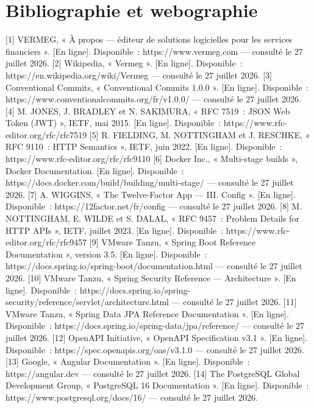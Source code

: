 \documentclass[12pt,a4paper]{report}
\begin{document}
\chapter*{Bibliographie et webographie}
[1] VERMEG, « À propos — éditeur de solutions logicielles pour les services financiers ». [En ligne]. Disponible~: https://www.vermeg.com — consulté le 27 juillet 2026.
[2] Wikipedia, « Vermeg ». [En ligne]. Disponible~: https://en.wikipedia.org/wiki/Vermeg — consulté le 27 juillet 2026.
[3] Conventional Commits, « Conventional Commits 1.0.0 ». [En ligne]. Disponible~: https://www.conventionalcommits.org/fr/v1.0.0/ — consulté le 27 juillet 2026.
[4] M. JONES, J. BRADLEY et N. SAKIMURA, « RFC 7519~: JSON Web Token (JWT) », IETF, mai 2015. [En ligne]. Disponible~: https://www.rfc-editor.org/rfc/rfc7519
[5] R. FIELDING, M. NOTTINGHAM et J. RESCHKE, « RFC 9110~: HTTP Semantics », IETF, juin 2022. [En ligne]. Disponible~: https://www.rfc-editor.org/rfc/rfc9110
[6] Docker Inc., « Multi-stage builds », Docker Documentation. [En ligne]. Disponible~: https://docs.docker.com/build/building/multi-stage/ — consulté le 27 juillet 2026.
[7] A. WIGGINS, « The Twelve-Factor App — III. Config ». [En ligne]. Disponible~: https://12factor.net/fr/config — consulté le 27 juillet 2026.
[8] M. NOTTINGHAM, E. WILDE et S. DALAL, « RFC 9457~: Problem Details for HTTP APIs », IETF, juillet 2023. [En ligne]. Disponible~: https://www.rfc-editor.org/rfc/rfc9457
[9] VMware Tanzu, « Spring Boot Reference Documentation », version 3.5. [En ligne]. Disponible~: https://docs.spring.io/spring-boot/documentation.html — consulté le 27 juillet 2026.
[10] VMware Tanzu, « Spring Security Reference — Architecture ». [En ligne]. Disponible~: https://docs.spring.io/spring-security/reference/servlet/architecture.html — consulté le 27 juillet 2026.
[11] VMware Tanzu, « Spring Data JPA Reference Documentation ». [En ligne]. Disponible~: https://docs.spring.io/spring-data/jpa/reference/ — consulté le 27 juillet 2026.
[12] OpenAPI Initiative, « OpenAPI Specification v3.1 ». [En ligne]. Disponible~: https://spec.openapis.org/oas/v3.1.0 — consulté le 27 juillet 2026.
[13] Google, « Angular Documentation ». [En ligne]. Disponible~: https://angular.dev — consulté le 27 juillet 2026.
[14] The PostgreSQL Global Development Group, « PostgreSQL 16 Documentation ». [En ligne]. Disponible~: https://www.postgresql.org/docs/16/ — consulté le 27 juillet 2026.
\newpage
\end{document}
